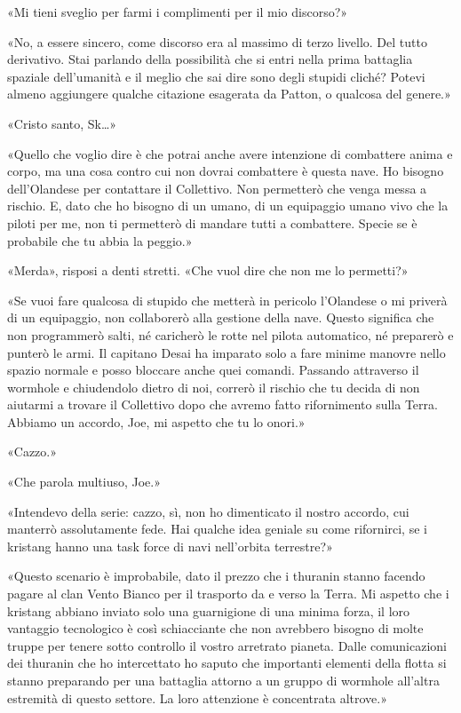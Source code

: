 «Mi tieni sveglio per farmi i complimenti per il mio discorso?»

«No, a essere sincero, come discorso era al massimo di terzo livello.
Del tutto derivativo. Stai parlando della possibilità che si entri nella
prima battaglia spaziale dell'umanità e il meglio che sai dire sono
degli stupidi cliché? Potevi almeno aggiungere qualche citazione
esagerata da Patton, o qualcosa del genere.»

«Cristo santo, Sk\ldots»

«Quello che voglio dire è che potrai anche avere intenzione di
combattere anima e corpo, ma una cosa contro cui non dovrai combattere è
questa nave. Ho bisogno dell'Olandese per contattare il Collettivo. Non
permetterò che venga messa a rischio. E, dato che ho bisogno di un
umano, di un equipaggio umano vivo che la piloti per me, non ti
permetterò di mandare tutti a combattere. Specie se è probabile che tu
abbia la peggio.»

«Merda», risposi a denti stretti. «Che vuol dire che non me lo
permetti?»

«Se vuoi fare qualcosa di stupido che metterà in pericolo l'Olandese o
mi priverà di un equipaggio, non collaborerò alla gestione della nave.
Questo significa che non programmerò salti, né caricherò le rotte nel
pilota automatico, né preparerò e punterò le armi. Il capitano Desai ha
imparato solo a fare minime manovre nello spazio normale e posso
bloccare anche quei comandi. Passando attraverso il wormhole e
chiudendolo dietro di noi, correrò il rischio che tu decida di non
aiutarmi a trovare il Collettivo dopo che avremo fatto rifornimento
sulla Terra. Abbiamo un accordo, Joe, mi aspetto che tu lo onori.»

«Cazzo.»

«Che parola multiuso, Joe.»

«Intendevo della serie: cazzo, sì, non ho dimenticato il nostro accordo,
cui manterrò assolutamente fede. Hai qualche idea geniale su come
rifornirci, se i kristang hanno una task force di navi nell'orbita
terrestre?»

«Questo scenario è improbabile, dato il prezzo che i thuranin stanno
facendo pagare al clan Vento Bianco per il trasporto da e verso la
Terra. Mi aspetto che i kristang abbiano inviato solo una guarnigione di
una minima forza, il loro vantaggio tecnologico è così schiacciante che
non avrebbero bisogno di molte truppe per tenere sotto controllo il
vostro arretrato pianeta. Dalle comunicazioni dei thuranin che ho
intercettato ho saputo che importanti elementi della flotta si stanno
preparando per una battaglia attorno a un gruppo di wormhole all'altra
estremità di questo settore. La loro attenzione è concentrata altrove.»

